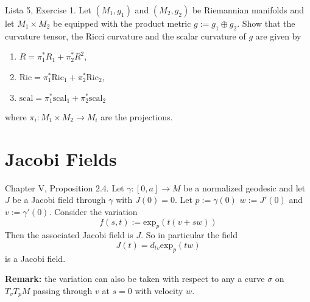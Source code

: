 \begin{exercise}
\label{exercise-curvatures-of-product-metric}
Lista 5, Exercise 1. Let $(M_1,g_1)$ and $(M_2,g_2)$ be Riemannian manifolds and
let $M_1\times M_2$ be equipped with the product metric $g:=g_1\oplus g_2$. Show
that the curvature tensor, the Ricci curvature and the scalar curvature of $g$
are given by
\begin{enumerate}
\item $R=\pi_1^*R_1+\pi_2^*R^2$,
\item $\text{Ric}=\pi_1^*\text{Ric}_1+\pi_2^*\text{Ric}_2$,
\item $\text{scal}=\pi_1^*\text{scal}_1+\pi_2^*\text{scal}_2$
\end{enumerate}
where $\pi_i:M_1\times M_2\to M_i$ are the projections.
\end{exercise}

\section{Jacobi Fields}
\label{section-jacobi-fields}

\begin{proposition}
\label{proposition-everyday-jacobi-field}
\cite{doc} Chapter V, Proposition 2.4. Let $\gamma:[0,a]\to M$ be a normalized
geodesic and let $J$ be a Jacobi field through $\gamma$ with $J(0)=0$.
Let $p:=\gamma(0)$ $w:=J'(0)$ and  $v:=\gamma'(0)$. 
Consider the variation
$$
f(s,t):=\text{exp}_{p}(t(v+sw))
$$
Then the associated Jacobi field is $J$. So in particular the field
$$
J(t)=d_{tv}\text{exp}_p(tw)
$$
is a Jacobi field.

{\bf Remark:} the variation can also be taken with respect to
any a curve $\sigma$ on $T_vT_{p}M$ passing through $v$ 
at $s=0$ with velocity $w$.
\end{proposition}

